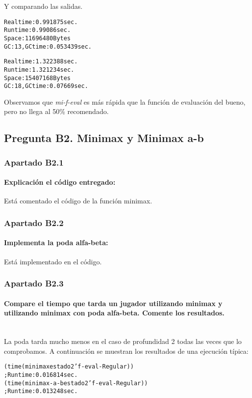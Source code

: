 \documentclass[nochap]{apuntes}
\begin{document}
Y comparando las salidas.

\begin{alltt}
Real time: 0.991875 sec.
Run time: 0.99086 sec.
Space: 11696480 Bytes
GC: 13, GC time: 0.053439 sec.

Real time: 1.322388 sec.
Run time: 1.321234 sec.
Space: 15407168 Bytes
GC: 18, GC time: 0.07669 sec.
\end{alltt}

Observamos que \textit{mi-f-eval} es más rápida que la función de evaluación del bueno, pero no llega al 50\% recomendado.

\subsection*{Pregunta B2. Minimax y Minimax a-b}
\subsubsection*{Apartado B2.1}

\paragraph{Explicación el código entregado:}

Está comentado el código de la función minimax.

\subsubsection*{Apartado B2.2}
\paragraph{Implementa la poda alfa-beta:}
Está implementado en el código.

\subsubsection*{Apartado B2.3}

\paragraph{Compare el tiempo que tarda un jugador utilizando minimax y utilizando minimax con poda alfa-beta. Comente los resultados.\\\\}


La poda tarda mucho menos en el caso de profundidad 2 todas las veces que lo comprobamos. A continuación se muestran los resultados de una ejecución típica:
\begin{alltt}
(time (minimax estado 2 'f-eval-Regular)) 
  ; Run time: 0.016814 sec.
(time (minimax-a-b estado 2 'f-eval-Regular)) 
  ; Run time: 0.013248 sec.
\end{alltt}
\end{document}
